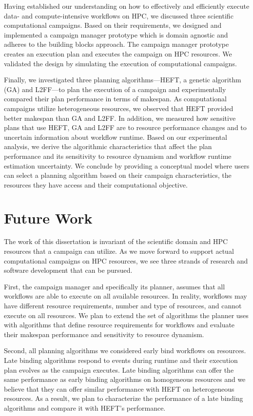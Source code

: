 Having established our understanding on how to effectively and efficiently
execute data- and compute-intensive workflows on HPC, we discussed three
scientific computational campaigns. Based on their requirements, we designed and
implemented a campaign manager prototype which is domain agnostic and adheres to
the building blocks approach. The campaign manager prototype creates an
execution plan and executes the campaign on HPC resources. We validated the
design by simulating the execution of computational campaigns.

Finally, we investigated three planning algorithms---HEFT, a genetic algorithm
(GA) and L2FF---to plan the execution of a campaign and experimentally compared
their plan performance in terms of makespan. As computational campaigns utilize
heterogeneous resources, we observed that HEFT provided better makespan than GA
and L2FF. In addition, we measured how sensitive plans that use HEFT, GA and
L2FF are to resource performance changes and to uncertain information about
workflow runtime. Based on our experimental analysis, we derive the algorithmic
characteristics that affect the plan performance and its sensitivity to resource
dynamism and workflow runtime estimation uncertainty. We conclude by providing a
conceptual model where users can select a planning algorithm based on their
campaign characteristics, the resources they have access and their computational
objective.

\section{Future Work}

The work of this dissertation is invariant of the scientific domain and HPC
resources that a campaign can utilize. As we move forward to support actual
computational campaigns on HPC resources, we see three strands of research and
software development that can be pursued.

First, the campaign manager and specifically its planner, assumes that all
workflows are able to execute on all available resources. In reality,
workflows may have different resource requirements, number and type of
resources, and cannot execute on all resources. We plan to extend the set of
algorithms the planner uses with algorithms that define resource requirements
for workflows and evaluate their makespan performance and sensitivity to
resource dynamism.

Second, all planning algorithms we considered early bind workflows on resources.
Late binding algorithms respond to events during runtime and their execution
plan evolves as the campaign executes. Late binding algorithms can offer the
same performance as early binding algorithms on homogeneous resources and we
believe that they can offer similar performance with HEFT on heterogeneous
resources. As a result, we plan to characterize the performance of a late
binding algorithms and compare it with HEFT's performance.

